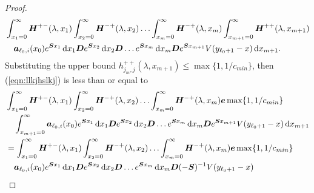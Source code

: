 \begin{proof}
\begin{align}
	&\int_{x_1=0}^\infty \boldsymbol H^{+-}(\lambda,x_1)\nonumber
	\int_{x_2=0}^\infty \boldsymbol H^{-+}(\lambda,x_2) 
	\hdots \int_{x_m=0}^\infty \boldsymbol H^{-+}(\lambda, x_m) 
	\int_{x_{m+1}=0}^\infty \boldsymbol H^{++}(\lambda,x_{m+1}) 
	\\&\quad\boldsymbol   a_{\ell_0,i}(x_0)e^{\boldsymbol{S}x_1}\, \mathrm{d} x_1 \boldsymbol{D}e^{\boldsymbol{S}x_2} \, \mathrm{d} x_2 \boldsymbol{D}\dots e^{\boldsymbol{S}x_m} \, \mathrm{d} x_m \boldsymbol{D}e^{\boldsymbol{S}x_{m+1}}V(y_{\ell_0+1}-x) \, \mathrm{d} x_{m+1}. \label{eqn:llkjhslkj}
\end{align}
	Substituting the upper bound \(h^{++}_{j_m,j}(\lambda,x_{m+1})\leq \max\{1, 1/c_{min}\}\), then (\ref{eqn:llkjhslkj}) is less than or equal to 
	\begin{align}
	&\int_{x_1=0}^\infty \bs H^{+-}(\lambda,x_1)\nonumber
	\int_{x_2=0}^\infty \bs H^{-+}(\lambda,x_2) 
	\hdots \int_{x_m=0}^\infty \bs H^{-+}(\lambda, x_m) \bs e\max\{1, 1/c_{min}\}
	\\&\quad\int_{x_{m+1}=0}^\infty \bs   a_{\ell_0,i}(x_0)e^{\bs{S}x_1}\wrt x_1 \bs{D}e^{\bs{S}x_2} \wrt x_2 \bs{D}\dots e^{\bs{S}x_m} \wrt x_m \bs{D}e^{\bs{S}x_{m+1}}V(y_{\ell_0+1}-x)\wrt x_{m+1} \nonumber
	\\&=\int_{x_1=0}^\infty \bs H^{+-}(\lambda,x_1)\nonumber
	\int_{x_2=0}^\infty \bs H^{-+}(\lambda,x_2) 
	\hdots \int_{x_m=0}^\infty \bs H^{-+}(\lambda, x_m) \bs e\max\{1, 1/c_{min}\}
	\\&\quad \bs   a_{\ell_0,i}(x_0)e^{\bs{S}x_1}\wrt x_1 \bs{D}e^{\bs{S}x_2} \wrt x_2 \bs{D}\dots e^{\bs{S}x_m} \wrt x_m \bs{D}(-\bs{S})^{-1}V(y_{\ell_0+1}-x) \nonumber

\end{align}
\end{proof}
